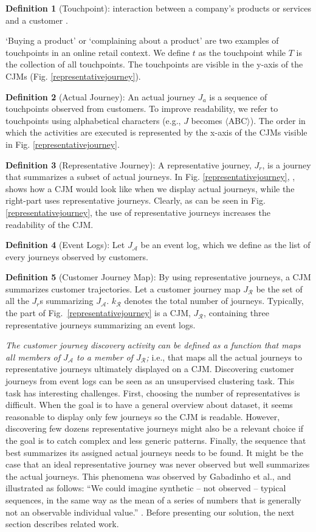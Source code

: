\documentclass[runningheads]{llncs}
\begin{document}
\textbf{Definition 1} (Touchpoint): interaction between a company's products or services  and a customer \cite{bernard2017cjm}. {`Buying a product' or `complaining about a product' are two examples of touchpoints in an online retail context. We define $t$ as the touchpoint while $T$ is the collection of all touchpoints. The touchpoints are visible in the y-axis of the CJMs (Fig. \ref{representativejourney}).

\textbf{Definition 2} (Actual Journey): An actual journey $J_a$ is a sequence of touchpoints observed from customers. To improve readability, we refer to touchpoints using alphabetical characters (e.g., $J$ becomes $\langle$ABC$\rangle$). The order in which the activities are executed is represented by the x-axis of the CJMs visible in Fig. \ref{representativejourney}.

\textbf{Definition 3} (Representative Journey): A representative journey, $J_{r}$, is a journey that summarizes a subset of actual journeys. In Fig. \ref{representativejourney}, , shows how a CJM would look like when we display actual journeys, while the right-part uses representative journeys. Clearly, as can be seen in Fig. \ref{representativejourney}, the use of  representative journeys increases the readability of the CJM. 

\textbf{Definition 4} (Event Logs): Let $J_{\mathcal{A}}$ be an event log, which we define as the list of every journeys observed by customers. 

\textbf{Definition 5} (Customer Journey Map): By using representative journeys, a CJM summarizes customer trajectories. Let a customer journey map $J_{\mathcal{R}}$ be the set of all the $J_{r}$s summarizing $J_{\mathcal{A}}$. $k_{\mathcal{R}}$ denotes the total number of journeys. Typically, the part  of Fig.~\ref{representativejourney} is a CJM, $J_{\mathcal{R}}$, containing three representative journeys summarizing an event logs.

{\it The customer journey discovery activity can be defined as a function that maps all members of $J_{\mathcal{A}}$ to a member of $J_{\mathcal{R}}$;} i.e., that maps all the actual journeys to representative journeys ultimately displayed on a CJM. Discovering customer journeys from event logs can be seen as an unsupervised clustering task. This task has interesting challenges. First, choosing the number of representatives is difficult. When the goal is to have a general overview about dataset, it seems reasonable to display only few journeys so the CJM is readable. However, discovering few dozens representative journeys might also be a relevant choice if the goal is to catch complex and less generic patterns. Finally, the sequence that best summarizes its assigned actual journeys needs to be found. It might be the case that an ideal representative journey was never observed but well summarizes the actual journeys. This phenomena was observed by Gabadinho et al., and illustrated as follows: ``We could imagine synthetic -- not observed -- typical sequences, in the same way as the mean of a series of numbers that is generally not an observable individual value.'' \cite{gabadinho2009extracting}. Before presenting our solution, the next section describes related work.

}
\end{document}
